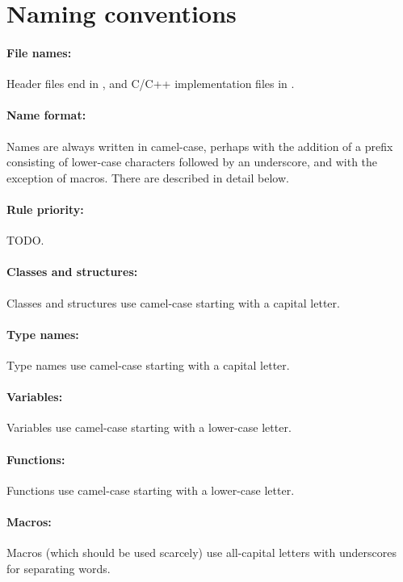 \documentclass[footinclude=false,11pt,DIV11]{scrartcl}
\begin{document}
\section{Naming conventions}

\paragraph{File names:} Header files end in , and C/C++ implementation files
in .

\paragraph{Name format:} Names are always written in camel-case, perhaps with the
addition of a prefix consisting of lower-case characters followed by an underscore,
and with the exception of macros. There are described in detail below.

\paragraph{Rule priority:} TODO.

\paragraph{Classes and structures:} Classes and structures use camel-case
starting with a capital letter.

\paragraph{Type names:} Type names use camel-case starting with a capital letter.

\paragraph{Variables:} Variables use camel-case starting with a lower-case letter.

\paragraph{Functions:} Functions use camel-case starting with a lower-case letter.

\paragraph{Macros:} Macros (which should be used scarcely) use all-capital letters
with underscores for separating words.
\end{document}

